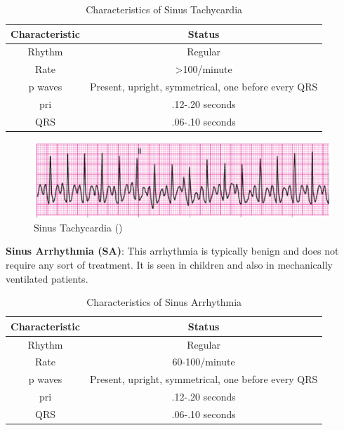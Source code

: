 \begin{table}[H]
\begin{center}
\begin{tabular}{||c || c||}
 \hline
\textbf{Characteristic} & \textbf{Status} \\ [0.4ex] 
 \hline\hline
 Rhythm & Regular \\
\hline
Rate & >100/minute \\
\hline
p waves & Present, upright, symmetrical, one before every QRS \\
\hline
pri & .12-.20 seconds \\
\hline
QRS & .06-.10 seconds \\
\hline\hline
\end{tabular}
\end{center}
\caption{Characteristics of Sinus Tachycardia}
\label{table:STach_characteristics}
\end{table}


 \begin{figure}[H]
\centering
\includegraphics[scale=0.8]{img/STach.png}
\caption{Sinus Tachycardia (\cite{arryth_types})}
\label{fig:STach}
\end{figure}

\textbf{Sinus Arrhythmia (SA)}: This arrhythmia is typically benign and does not require any sort of treatment. It is seen in children and also in mechanically ventilated patients.

\begin{table}[H]
\begin{center}
\begin{tabular}{||c || c||}
 \hline
\textbf{Characteristic} & \textbf{Status} \\ [0.4ex] 
 \hline\hline
 Rhythm & Regular \\
\hline
Rate & 60-100/minute \\
\hline
p waves & Present, upright, symmetrical, one before every QRS \\
\hline
pri & .12-.20 seconds \\
\hline
QRS & .06-.10 seconds \\
\hline\hline
\end{tabular}
\end{center}
\caption{Characteristics of Sinus Arrhythmia}
\label{table:SA_characteristics}
\end{table}


